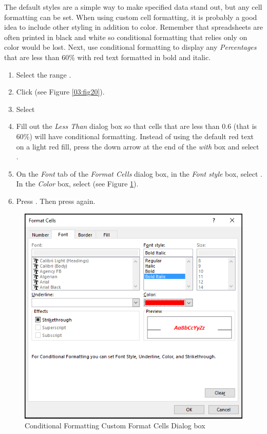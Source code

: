 The default styles are a simple way to make specified data stand out, but any cell formatting can be set. When using custom cell formatting, it is probably a good idea to include other styling in addition to color. Remember that spreadsheets are often printed in black and white so conditional formatting that relies only on color would be lost. Next, use conditional formatting to display any \textit{Percentages} that are less than $ 60\% $ with red text formatted in bold and italic.

\begin{enumerate}
	\item Select the range .
	\item Click  (see Figure \ref{03:fig20}).
	\item Select 
	\item Fill out the \textit{Less Than} dialog box so that cells that are less than $ 0.6 $ (that is 60\%) will have conditional formatting. Instead of using the default red text on a light red fill, press the down arrow at the end of the \textit{with} box and select .
	\item On the \textit{Font} tab of the \textit{Format Cells} dialog box, in the \textit{Font style} box, select . In the \textit{Color} box, select  (see Figure \ref{03:fig22}).
	\item Press . Then press  again.
\end{enumerate}

\begin{figure}[H]
	\centering
	\includegraphics[width=\maxwidth{.95\linewidth}]{gfx/ch03_fig22}
	\caption{Conditional Formatting Custom Format Cells Dialog box}
	\label{03:fig22}
\end{figure}

